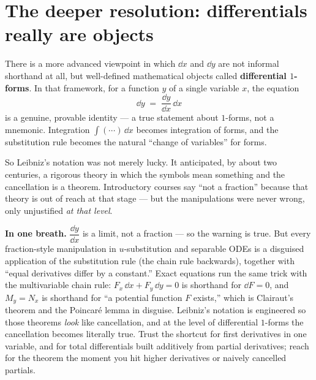 \documentclass{essay}
\newcommand{\ddx}[1]{\frac{\dd #1}{\dd x}}
\begin{document}
\section{The deeper resolution: differentials really are objects}
\label{sec:deeper}

There is a more advanced viewpoint in which \(\dd x\) and \(\dd y\) are
not informal shorthand at all, but well-defined mathematical objects
called \textbf{differential \(1\)-forms}. In that framework, for a
function \(y\) of a single variable \(x\), the equation
\[ \dd y \;=\; \ddx{y}\,\dd x \]
is a genuine, provable identity --- a true statement about \(1\)-forms,
not a mnemonic. Integration \(\int(\cdots)\,\dd x\) becomes integration
of forms, and the substitution rule becomes the natural ``change of
variables'' for forms.

So Leibniz's notation was not merely lucky. It anticipated, by about
two centuries, a rigorous theory in which the symbols mean something
and the cancellation is a theorem. Introductory courses say ``not a
fraction'' because that theory is out of reach at that stage --- but
the manipulations were never wrong, only unjustified \emph{at that level}.

\textbf{In one breath.}
\(\dfrac{\dd y}{\dd x}\) is a limit, not a fraction --- so the
warning is true. But every fraction-style manipulation in
\(u\)-substitution and separable ODEs is a disguised application of
the substitution rule (the chain rule backwards), together with
``equal derivatives differ by a constant.'' Exact equations run the
same trick with the multivariable chain rule: \(F_{x}\,\dd x+F_{y}\,\dd
y=0\) is shorthand for \(\dd F=0\), and \(M_{y}=N_{x}\) is shorthand for
``a potential function \(F\) exists,'' which is Clairaut's theorem
and the Poincar\'e lemma in disguise. Leibniz's notation is
engineered so those theorems \emph{look} like cancellation, and at
the level of differential \(1\)-forms the cancellation becomes
literally true. Trust the shortcut for first derivatives in one
variable, and for total differentials built additively from partial
derivatives; reach for the theorem the moment you hit higher
derivatives or naively cancelled partials.
\end{document}
